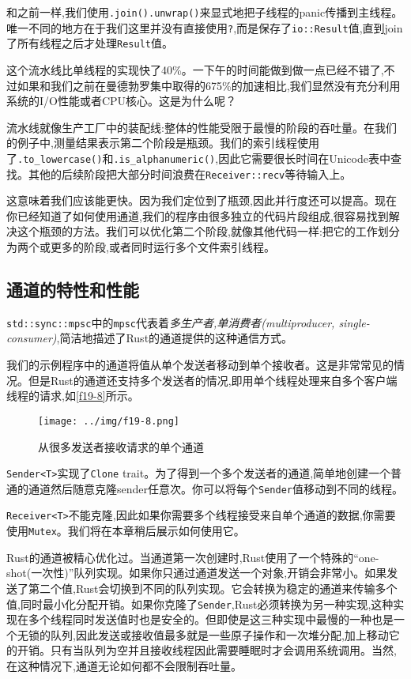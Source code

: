 和之前一样,我们使用\texttt{.join().unwrap()}来显式地把子线程的panic传播到主线程。唯一不同的地方在于我们这里并没有直接使用\texttt{?},而是保存了\texttt{io::Result}值,直到join了所有线程之后才处理\texttt{Result}值。

这个流水线比单线程的实现快了40\%。一下午的时间能做到做一点已经不错了,不过如果和我们之前在曼德勃罗集中取得的675\%的加速相比,我们显然没有充分利用系统的I/O性能或者CPU核心。这是为什么呢？

流水线就像生产工厂中的装配线:整体的性能受限于最慢的阶段的吞吐量。在我们的例子中,测量结果表示第二个阶段是瓶颈。我们的索引线程使用了\texttt{.to\_lowercase()}和\texttt{.is\_alphanumeric()},因此它需要很长时间在Unicode表中查找。其他的后续阶段把大部分时间浪费在\texttt{Receiver::recv}等待输入上。

这意味着我们应该能更快。因为我们定位到了瓶颈,因此并行度还可以提高。现在你已经知道了如何使用通道,我们的程序由很多独立的代码片段组成,很容易找到解决这个瓶颈的方法。我们可以优化第二个阶段,就像其他代码一样:把它的工作划分为两个或更多的阶段,或者同时运行多个文件索引线程。

\subsection{通道的特性和性能}
\texttt{std::sync::mpsc}中的\texttt{mpsc}代表着\emph{多生产者,单消费者(multiproducer, single-consumer)},简洁地描述了Rust的通道提供的这种通信方式。

我们的示例程序中的通道将值从单个发送者移动到单个接收者。这是非常常见的情况。但是Rust的通道还支持多个发送者的情况,即用单个线程处理来自多个客户端线程的请求,如\autoref{f19-8}所示。

\begin{figure}[htbp]
    \centering
    \texttt{[image: ../img/f19-8.png]}
    \caption{从很多发送者接收请求的单个通道}
    \label{f19-8}
\end{figure}

\texttt{Sender<T>}实现了\texttt{Clone} trait。为了得到一个多个发送者的通道,简单地创建一个普通的通道然后随意克隆sender任意次。你可以将每个\texttt{Sender}值移动到不同的线程。

\texttt{Receiver<T>}不能克隆,因此如果你需要多个线程接受来自单个通道的数据,你需要使用\texttt{Mutex}。我们将在本章稍后展示如何使用它。

Rust的通道被精心优化过。当通道第一次创建时,Rust使用了一个特殊的“one-shot(一次性)”队列实现。如果你只通过通道发送一个对象,开销会非常小。如果发送了第二个值,Rust会切换到不同的队列实现。它会转换为稳定的通道来传输多个值,同时最小化分配开销。如果你克隆了\texttt{Sender},Rust必须转换为另一种实现,这种实现在多个线程同时发送值时也是安全的。但即使是这三种实现中最慢的一种也是一个无锁的队列,因此发送或接收值最多就是一些原子操作和一次堆分配,加上移动它的开销。只有当队列为空并且接收线程因此需要睡眠时才会调用系统调用。当然,在这种情况下,通道无论如何都不会限制吞吐量。


